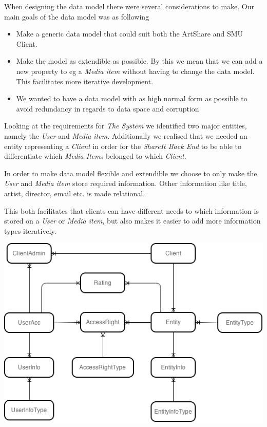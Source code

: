 \documentclass[../report.tex]{subfiles}
\begin{document}
When designing the data model there were several considerations to make. Our main goals of the data model was as following
\begin{itemize}
\item Make a generic data model that could suit both the ArtShare and SMU Client.
\item Make the model as extendible as possible. By this we mean that we can add a new property to eg a \textit{Media item} without having to change the data model. This facilitates more iterative development.
\item We wanted to have a data model with as high normal form as possible to avoid redundancy in regards to data space and corruption
\end{itemize} 






Looking at the requirements for \textit{The System} we identified two major entities, namely the \textit{User} and \textit{Media item}. Additionally we realised that we needed an entity representing a \textit{Client} in order for the \textit{ShareIt Back End} to be able to differentiate which \textit{Media Item}s belonged to which \textit{Client}. 

In order to make data model flexible and extendible we choose to only make the \textit{User} and \textit{Media item} store required information. Other information like title, artist, director, email etc. is made relational. 

This both facilitates that clients can have different needs to which information is stored on a \textit{User} or \textit{Media item}, but also makes it easier to add more information types iteratively. 

\includegraphics{img/ER}
\end{document}
